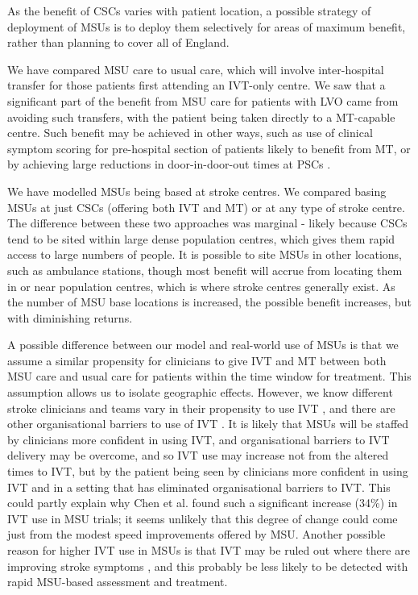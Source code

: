 As the benefit of CSCs varies with patient location, a possible strategy of deployment of MSUs is to deploy them selectively for areas of maximum benefit, rather than planning to cover all of England.

We have compared MSU care to usual care, which will involve inter-hospital transfer for those patients first attending an IVT-only centre. We saw that a significant part of the benefit from MSU care for patients with LVO came from avoiding such transfers, with the patient being taken directly to a MT-capable centre. Such benefit may be achieved in other ways, such as use of clinical symptom scoring for pre-hospital section of patients likely to benefit from MT, or by achieving large reductions in door-in-door-out times at PSCs \cite{perez_de_la_ossa_effect_2022}.

We have modelled MSUs being based at stroke centres. We compared basing MSUs at just CSCs (offering both IVT and MT) or at any type of stroke centre. The difference between these two approaches was marginal - likely because CSCs tend to be sited within large dense population centres, which gives them rapid access to large numbers of people. It is possible to site MSUs in other locations, such as ambulance stations, though most benefit will accrue from locating them in or near population centres, which is where stroke centres generally exist. As the number of MSU base locations is increased, the possible benefit increases, but with diminishing returns. 

A possible difference between our model and real-world use of MSUs is that we assume a similar propensity for clinicians to give IVT and MT between both MSU care and usual care for patients within the time window for treatment. This assumption allows us to isolate geographic effects. However, we know different stroke clinicians and teams vary in their propensity to use IVT \cite{de_brun_factors_2018, pearn_what_2023}, and there are other organisational barriers to use of IVT \cite{meurer_provider_2011}. It is likely that MSUs will be staffed by clinicians more confident in using IVT, and organisational barriers to IVT delivery may be overcome, and so IVT use may increase not from the altered times to IVT, but by the patient being seen by clinicians more confident in using IVT and in a setting that has eliminated organisational barriers to IVT. This could partly explain why Chen et al. \cite{chen_systematic_2022} found such a significant increase (34\%) in IVT use in MSU trials; it seems unlikely that this degree of change could come just from the modest speed improvements offered by MSU. Another possible reason for higher IVT use in MSUs is that IVT may be ruled out where there are improving stroke symptoms \cite{balucani_mild_2011}, and this probably be less likely to be detected with rapid MSU-based assessment and treatment.

